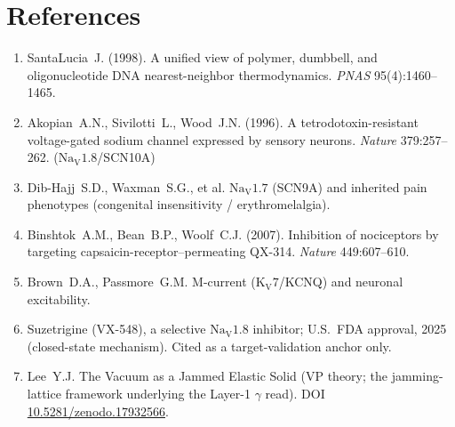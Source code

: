 \documentclass[11pt]{article}
\begin{document}
\section*{References}
\begin{footnotesize}
\begin{enumerate}[leftmargin=2.2em]
\item SantaLucia~J. (1998). A unified view of polymer, dumbbell, and oligonucleotide DNA nearest-neighbor thermodynamics. \emph{PNAS} 95(4):1460--1465.
\item Akopian~A.N., Sivilotti~L., Wood~J.N. (1996). A tetrodotoxin-resistant voltage-gated sodium channel expressed by sensory neurons. \emph{Nature} 379:257--262. ($\mathrm{Na_V}1.8$/SCN10A)
\item Dib-Hajj~S.D., Waxman~S.G., et al. $\mathrm{Na_V}1.7$ (SCN9A) and inherited pain phenotypes (congenital insensitivity / erythromelalgia).
\item Binshtok~A.M., Bean~B.P., Woolf~C.J. (2007). Inhibition of nociceptors by targeting capsaicin-receptor--permeating QX-314. \emph{Nature} 449:607--610.
\item Brown~D.A., Passmore~G.M. M-current ($\mathrm{K_V}7$/KCNQ) and neuronal excitability.
\item Suzetrigine (VX-548), a selective $\mathrm{Na_V}1.8$ inhibitor; U.S.\ FDA approval, 2025 (closed-state mechanism). Cited as a target-validation anchor only.
\item Lee~Y.J. The Vacuum as a Jammed Elastic Solid (VP theory; the jamming-lattice framework underlying the Layer-1 $\gamma$ read). DOI \href{https://doi.org/10.5281/zenodo.17932566}{10.5281/zenodo.17932566}.
\end{enumerate}
\end{footnotesize}

\appendix
\end{document}
